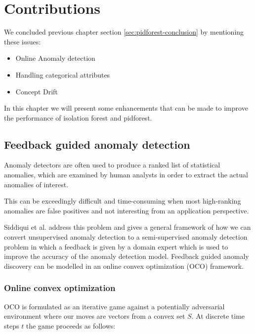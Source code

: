 \chapter{Contributions}
\label{ch:contributions}

We concluded previous chapter section \ref{sec:pidforest-conclusion} by mentioning these issues:
\vspace{-0.5em}
\begin{itemize}
    \setlength\itemsep{-0.5em}
    \item Online Anomaly detection
    \item Handling categorical attributes
    \item Concept Drift
\end{itemize}

In this chapter we will present some enhancements that can be made to improve the performance of isolation forest and pidforest.


\section{Feedback guided anomaly detection}
\label{sec:feedback-guided-anomaly-detection}

Anomaly detectors are often used to produce a ranked list of statistical anomalies, which are examined by human analysts in order to extract the actual anomalies of interest. 

This can be exceedingly difficult and time-consuming when most high-ranking anomalies are false positives and not interesting from an application perspective.

Siddiqui et al. \cite{10.1145/3219819.3220083} address this problem and gives a general framework of how we can convert unsupervised anomaly detection to a semi-supervised anomaly detection problem in which a feedback is given by a domain expert which is used to improve the accuracy of the anomaly detection model. 
Feedback guided anomaly discovery can be modelled in an online convex optimization (OCO) framework. 


\subsection{Online convex optimization}
\label{subsec:online-convex-optimization}

OCO is formulated as an iterative game against a potentially adversarial environment where our moves are vectors from a convex set $S$.
At discrete time steps $t$ the game proceeds as follows:

